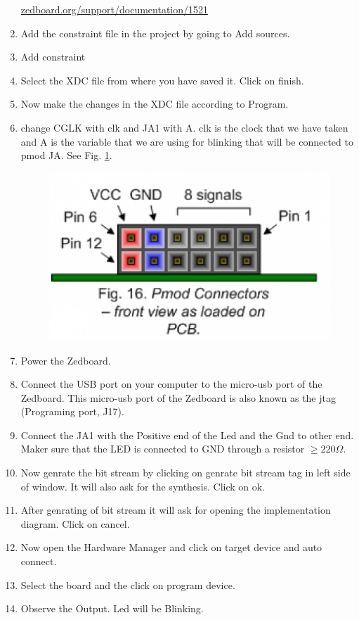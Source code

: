 \documentclass[journal,12pt,twocolumn]{IEEEtran}
\begin{document}
\begin{enumerate}
\url{zedboard.org/support/documentation/1521}
\item Add the constraint file in the project by going to Add sources.
\item Add constraint 
\item Select the XDC file from where you have saved it. Click on finish.
\item Now make the changes in the XDC file according to Program.
\item change CGLK with clk and JA1 with A. clk is the clock that we have taken and A is the variable that we are using for blinking that will be connected to pmod JA. See Fig. \ref{fig:PMOD}.
\begin {figure}[h]
    \centering
    \includegraphics[scale=.4]{pmod.eps}
    \caption{}
    \label{fig:PMOD}
\end{figure}
\item Power the Zedboard.
\item Connect the USB port on your computer to the micro-usb port of the Zedboard.  This micro-usb port of the Zedboard is also known as the jtag (Programing port, J17).
\item Connect the JA1 with the Positive end of the Led and the Gnd to other end. Maker sure that the LED is connected to GND through a resistor $\ge 220 \Omega$.
\item Now genrate the bit stream by clicking on genrate bit stream tag in left side of window. It will also ask for the synthesis. Click on ok.
\item After genrating of bit stream it will ask for opening the implementation diagram. Click on cancel.
\item Now open the Hardware Manager and click on target device and auto connect.
\item Select the board and the click on program device.
\item Observe the Output. Led will be Blinking.


\end{enumerate}
\end{document}
